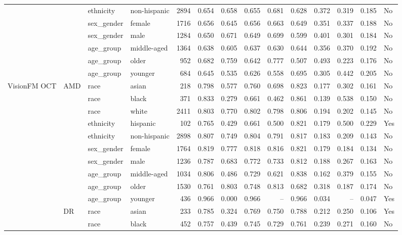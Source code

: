 \begin{longtable}{@{}lll l rrrrrrrr@{}}
 &  & ethnicity & non-hispanic & 2894 & 0.654 & 0.658 & 0.655 & 0.681 & 0.628 & 0.372 & 0.319 & 0.185 & No \\
 &  & sex\_gender & female & 1716 & 0.656 & 0.645 & 0.656 & 0.663 & 0.649 & 0.351 & 0.337 & 0.188 & No \\
 &  & sex\_gender & male & 1284 & 0.650 & 0.671 & 0.649 & 0.699 & 0.599 & 0.401 & 0.301 & 0.184 & No \\
 &  & age\_group & middle-aged & 1364 & 0.638 & 0.605 & 0.637 & 0.630 & 0.644 & 0.356 & 0.370 & 0.192 & No \\
 &  & age\_group & older & 952 & 0.682 & 0.759 & 0.642 & 0.777 & 0.507 & 0.493 & 0.223 & 0.176 & No \\
 &  & age\_group & younger & 684 & 0.645 & 0.535 & 0.626 & 0.558 & 0.695 & 0.305 & 0.442 & 0.205 & No \\
VisionFM OCT & AMD & race & asian & 218 & 0.798 & 0.577 & 0.760 & 0.698 & 0.823 & 0.177 & 0.302 & 0.161 & No \\
 &  & race & black & 371 & 0.833 & 0.279 & 0.661 & 0.462 & 0.861 & 0.139 & 0.538 & 0.150 & No \\
 &  & race & white & 2411 & 0.803 & 0.770 & 0.802 & 0.798 & 0.806 & 0.194 & 0.202 & 0.145 & No \\
 &  & ethnicity & hispanic & 102 & 0.765 & 0.429 & 0.661 & 0.500 & 0.821 & 0.179 & 0.500 & 0.229 & Yes \\
 &  & ethnicity & non-hispanic & 2898 & 0.807 & 0.749 & 0.804 & 0.791 & 0.817 & 0.183 & 0.209 & 0.143 & No \\
 &  & sex\_gender & female & 1764 & 0.819 & 0.777 & 0.818 & 0.816 & 0.821 & 0.179 & 0.184 & 0.134 & No \\
 &  & sex\_gender & male & 1236 & 0.787 & 0.683 & 0.772 & 0.733 & 0.812 & 0.188 & 0.267 & 0.163 & No \\
 &  & age\_group & middle-aged & 1034 & 0.806 & 0.486 & 0.729 & 0.621 & 0.838 & 0.162 & 0.379 & 0.155 & No \\
 &  & age\_group & older & 1530 & 0.761 & 0.803 & 0.748 & 0.813 & 0.682 & 0.318 & 0.187 & 0.174 & No \\
 &  & age\_group & younger & 436 & 0.966 & 0.000 & 0.966 & -- & 0.966 & 0.034 & -- & 0.047 & Yes \\
 & DR & race & asian & 233 & 0.785 & 0.324 & 0.769 & 0.750 & 0.788 & 0.212 & 0.250 & 0.106 & Yes \\
 &  & race & black & 452 & 0.757 & 0.439 & 0.745 & 0.729 & 0.761 & 0.239 & 0.271 & 0.160 & No \\

\end{longtable}
